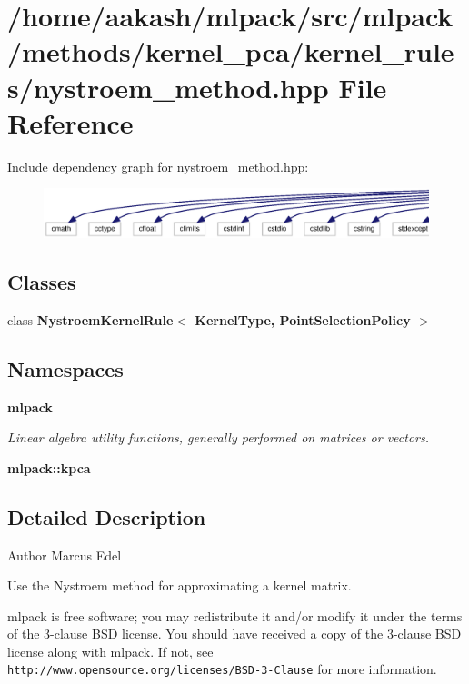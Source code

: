 \section{/home/aakash/mlpack/src/mlpack/methods/kernel\+\_\+pca/kernel\+\_\+rules/nystroem\+\_\+method.hpp File Reference}
\label{kernel__pca_2kernel__rules_2nystroem__method_8hpp}
Include dependency graph for nystroem\+\_\+method.\+hpp\+:
\nopagebreak
\begin{figure}[H]
\begin{center}
\leavevmode
\includegraphics[width=350pt]{kernel__pca_2kernel__rules_2nystroem__method_8hpp__incl}
\end{center}
\end{figure}
\subsection*{Classes}
\begin{DoxyCompactItemize}
\item 
class \textbf{ Nystroem\+Kernel\+Rule$<$ Kernel\+Type, Point\+Selection\+Policy $>$}
\end{DoxyCompactItemize}
\subsection*{Namespaces}
\begin{DoxyCompactItemize}
\item 
 \textbf{ mlpack}
\begin{DoxyCompactList}\small\item\em Linear algebra utility functions, generally performed on matrices or vectors. \end{DoxyCompactList}\item 
 \textbf{ mlpack\+::kpca}
\end{DoxyCompactItemize}


\subsection{Detailed Description}
\begin{DoxyAuthor}{Author}
Marcus Edel
\end{DoxyAuthor}
Use the Nystroem method for approximating a kernel matrix.

mlpack is free software; you may redistribute it and/or modify it under the terms of the 3-\/clause B\+SD license. You should have received a copy of the 3-\/clause B\+SD license along with mlpack. If not, see {\tt http\+://www.\+opensource.\+org/licenses/\+B\+S\+D-\/3-\/\+Clause} for more information. 